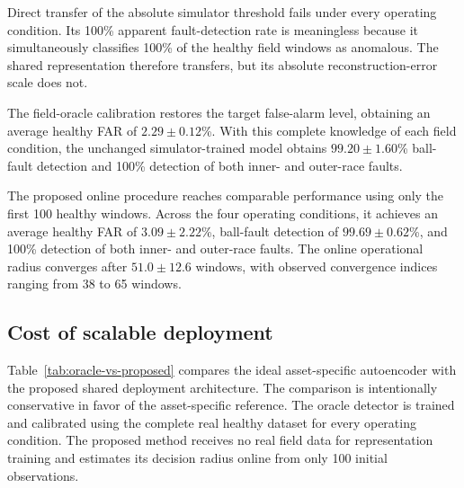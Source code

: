 \documentclass[11pt,a4paper]{article}
\begin{document}
Direct transfer of the absolute simulator threshold fails under every operating condition. Its
100\% apparent fault-detection rate is meaningless because it simultaneously classifies
100\% of the healthy field windows as anomalous. The shared representation therefore transfers,
but its absolute reconstruction-error scale does not.

The field-oracle calibration restores the target false-alarm level, obtaining an average healthy
FAR of $2.29\pm0.12$\%. With this complete knowledge of each field condition, the unchanged
simulator-trained model obtains $99.20\pm1.60$\% ball-fault detection and 100\% detection of
both inner- and outer-race faults.

The proposed online procedure reaches comparable performance using only the first 100 healthy
windows. Across the four operating conditions, it achieves an average healthy FAR of
$3.09\pm2.22$\%, ball-fault detection of $99.69\pm0.62$\%, and 100\% detection of both
inner- and outer-race faults. The online operational radius converges after
$51.0\pm12.6$ windows, with observed convergence indices ranging from 38 to 65 windows.

\subsection{Cost of scalable deployment}
\label{sec:deployment-cost}

Table~\ref{tab:oracle-vs-proposed} compares the ideal asset-specific autoencoder with the proposed
shared deployment architecture. The comparison is intentionally conservative in favor of the
asset-specific reference. The oracle detector is trained and calibrated using the complete real
healthy dataset for every operating condition. The proposed method receives no real field data
for representation training and estimates its decision radius online from only 100 initial
observations.
\end{document}
